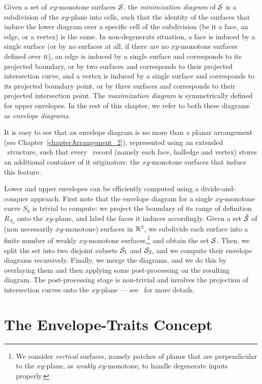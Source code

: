 Given a set of $xy$-monotone surfaces ${\cal S}$, the {\em minimization
diagram} of ${\cal S}$ is a subdivision of the $xy$-plane into cells,
such that the identity of the surfaces that induce the lower diagram
over a specific cell of the subdivision (be it a face, an edge, or
a vertex) is the same. In non-degenerate situation, a face is
induced by a single surface (or by no surfaces at all, if there are
no $xy$-monotone surfaces defined over it), an edge is induced by a 
single surface and corresponds to its projected boundary, or by two 
surfaces and corresponds to their projected intersection curve, and
a vertex is induced by a single surface and corresponds to its projected 
boundary point, or by three surfaces and corresponds to their projected 
intersection point. The {\em maximization diagram} is symmetrically 
defined for upper envelopes. In the rest of this chapter, we refer to 
both these diagrams as {\em envelope diagrams}.

It is easy to see that an envelope diagram is no more than a planar
arrangement (see Chapter~\ref{chapterArrangement_2}), represented
using an extended \dcel\ structure, such that every \dcel\ record
(namely each face, halfedge and vertex) stores an additional container
of it originators: the $xy$-monotone surfaces that induce this feature.

Lower and upper envelopes can be efficiently computed using a
divide-and-conquer approach. First note that the envelope diagram for
a single $xy$-monotone curve $S_k$ is trivial to compute: we project
the boundary of its range of definition $R_{S_k}$ onto the $xy$-plane,
and label the faces it induces accordingly. Given a set $\hat{{\cal S}}$
of (non necessarily $xy$-monotone) surfaces in $\mathbb{R}^3$, we subdivide
each surface into a finite number of weakly $xy$-monotone 
surfaces,\footnote{We consider {\em vertical} surfaces, namely patches 
of planes that are perpendicular to the $xy$-plane, as {\em weakly} 
$xy$-monotone, to handle degenerate inputs properly.} and obtain the 
set ${\cal S}$. Then, we split the set into two disjoint subsets ${\cal S}_1$
and ${\cal S}_2$, and we compute their envelope diagrams recursively.
Finally, we merge the diagrams, and we do this by overlaying them and 
then applying some post-processing on the resulting diagram. The 
post-processing stage is non-trivial and involves the projection of 
intersection curves onto the $xy$-plane --- see~\cite{cgal:m-rgece-06}
for more details.

\section{The Envelope-Traits Concept}

